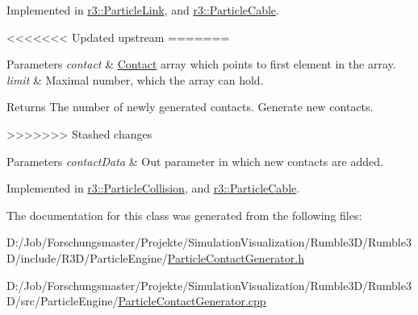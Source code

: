 Implemented in \mbox{\hyperlink{classr3_1_1_particle_link_a07abe1381e0b5ed7e1597099dc0c072d}{r3\+::\+Particle\+Link}}, and \mbox{\hyperlink{classr3_1_1_particle_cable_af8024236316ae2cf7bd68a0e906ed7c7}{r3\+::\+Particle\+Cable}}.

<<<<<<< Updated upstream
=======
\begin{DoxyParams}{Parameters}
{\em contact} & \mbox{\hyperlink{classr3_1_1_contact}{Contact}} array which points to first element in the array. \\
\hline
{\em limit} & Maximal number, which the array can hold. \\
\hline
\end{DoxyParams}
\begin{DoxyReturn}{Returns}
The number of newly generated contacts. Generate new contacts. 
\end{DoxyReturn}
>>>>>>> Stashed changes

\begin{DoxyParams}{Parameters}
{\em contact\+Data} & Out parameter in which new contacts are added. \\
\hline
\end{DoxyParams}


Implemented in \mbox{\hyperlink{classr3_1_1_particle_collision_adb77c85cb90707073e7c654acb2e6719}{r3\+::\+Particle\+Collision}}, and \mbox{\hyperlink{classr3_1_1_particle_cable_a5187ee9d99fb41cf6e719c22c9b30a7c}{r3\+::\+Particle\+Cable}}.



The documentation for this class was generated from the following files\+:\begin{DoxyCompactItemize}
\item 
D\+:/\+Job/\+Forschungsmaster/\+Projekte/\+Simulation\+Visualization/\+Rumble3\+D/\+Rumble3\+D/include/\+R3\+D/\+Particle\+Engine/\mbox{\hyperlink{_particle_contact_generator_8h}{Particle\+Contact\+Generator.\+h}}\item 
D\+:/\+Job/\+Forschungsmaster/\+Projekte/\+Simulation\+Visualization/\+Rumble3\+D/\+Rumble3\+D/src/\+Particle\+Engine/\mbox{\hyperlink{_particle_contact_generator_8cpp}{Particle\+Contact\+Generator.\+cpp}}\end{DoxyCompactItemize}
